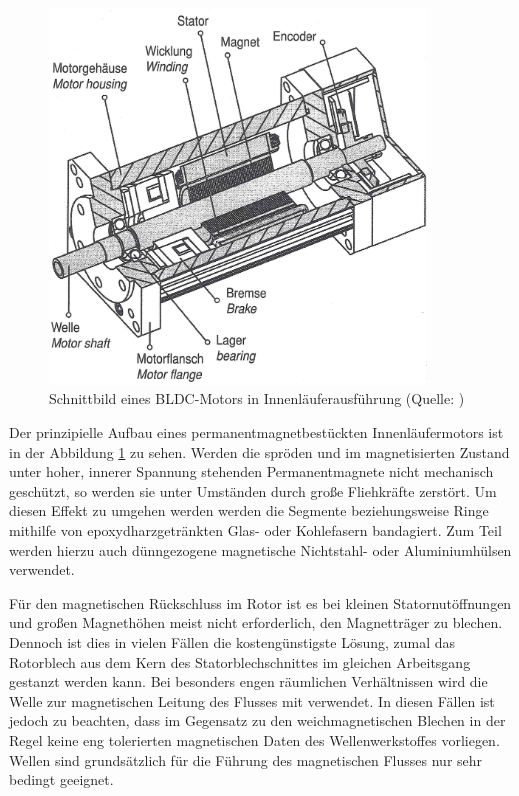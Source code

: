 \begin{figure}[h]
    \centering
    \includegraphics[width=10cm]{./Grafiken/3_1}
    \caption[Schnittbild eines BLDC-Motors in Innenläuferausführung]{Schnittbild eines BLDC-Motors in Innenläuferausführung (Quelle: \parencite[S. 75]{Stölting2011})}
    \label{fig:3_1}
  \end{figure}

Der prinzipielle Aufbau eines permanentmagnetbestückten Innenläufermotors ist in der Abbildung \ref{fig:3_1} zu sehen. Werden die spröden und im magnetisierten Zustand unter hoher, innerer Spannung stehenden Permanentmagnete nicht mechanisch geschützt, so werden sie unter Umständen durch große Fliehkräfte zerstört. Um diesen Effekt zu umgehen werden werden die Segmente beziehungsweise Ringe mithilfe von epoxydharzgetränkten Glas- oder Kohlefasern bandagiert. Zum Teil werden hierzu auch dünngezogene magnetische Nichtstahl- oder Aluminiumhülsen verwendet.

Für den magnetischen Rückschluss im Rotor ist es bei kleinen Statornutöffnungen und großen Magnethöhen meist nicht erforderlich, den Magnetträger zu blechen. Dennoch ist dies in vielen Fällen die kostengünstigste Lösung, zumal das Rotorblech aus dem Kern des Statorblechschnittes im gleichen Arbeitsgang gestanzt werden kann. Bei besonders engen räumlichen Verhältnissen wird die Welle zur magnetischen Leitung des Flusses mit verwendet. In diesen Fällen ist jedoch zu beachten, dass im Gegensatz zu den weichmagnetischen Blechen in der Regel keine eng tolerierten magnetischen Daten des Wellenwerkstoffes vorliegen. Wellen sind grundsätzlich für die Führung des magnetischen Flusses nur sehr bedingt geeignet.

